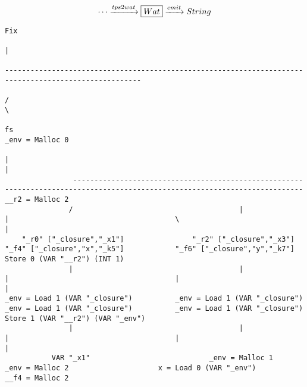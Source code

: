\begin{landscape}
\begin{gather*}
  \cdots \xrightarrow{tps2wat} \boxed{Wat} \xrightarrow{emit} String
\end{gather*}
\begin{lstlisting}[basicstyle=\fontsize{6.5}{7.5}\selectfont\ttfamily]
                                                                                                    Fix
                                                                                                     |
                                                                                ------------------------------------------------------------------------------------------------------
                                                                               /                                                                                                      \
                                                                               fs                                                                                              _env = Malloc 0
                                                                               |                                                                                                      |
                ----------------------------------------------------------------------------------------------------------------------------                                   __r2 = Malloc 2
               /                                       |                                            |                                       \                                         |
    "_r0" ["_closure","_x1"]                "_r2" ["_closure","_x3"]                   "_f4" ["_closure","x","_k5"]            "_f6" ["_closure","y","_k7"]              Store 0 (VAR "__r2") (INT 1)
               |                                       |                                            |                                       |                                         |
_env = Load 1 (VAR "_closure")          _env = Load 1 (VAR "_closure")               _env = Load 1 (VAR "_closure")          _env = Load 1 (VAR "_closure")           Store 1 (VAR "__r2") (VAR "_env")
               |                                       |                                            |                                       |                                         |
           VAR "_x1"                            _env = Malloc 1                              _env = Malloc 2                     x = Load 0 (VAR "_env")                       __f4 = Malloc 2

\end{lstlisting}
\end{landscape}
